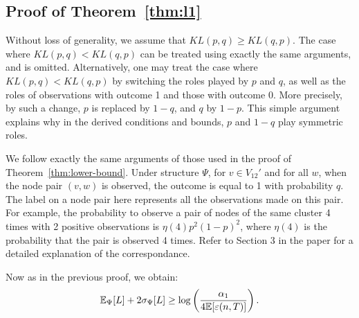 \subsection{Proof of Theorem~\ref{thm:l1}}

Without loss of generality, we assume that $KL(p,q) \ge
KL(q,p)$. The case where $KL(p,q) < KL(q,p)$ can be treated using exactly the same arguments, and is omitted. Alternatively, one may treat the case where $KL(p,q) < KL(q,p)$ by switching the roles played by $p$ and $q$, as well as the roles of observations with outcome 1 and those with outcome 0. More precisely, by such a change, $p$ is replaced by $1-q$, and $q$ by $1-p$. This simple argument explains why in the derived conditions and bounds, $p$ and $1-q$ play symmetric roles.

We follow exactly the same arguments of those used in the proof of Theorem~\ref{thm:lower-bound}. Under structure $\Psi$, for $v \in V_{12}'$ and for all $w$, when the node pair $(v, w)$ is observed, the outcome is equal to 1 with probability $q$. The label on a node pair here represents all the observations made on this pair. For example, the probability to observe a pair of nodes of the same cluster 4 times with 2 positive observations is $\eta(4)p^2(1-p)^2$, where $\eta(4)$ is the probability that the pair is observed 4 times. Refer to Section 3 in the paper for a detailed explanation of the correspondance. 

Now as in the previous proof, we obtain:
\begin{equation}
{\mathbb E}_{\Psi}[L] + 2\sigma_{\Psi}[L] \ge \log \left(\frac{\alpha_1}{4 {\mathbb E} [ \varepsilon(n,T) ]} \right).\label{eq:chevy}
\end{equation}

